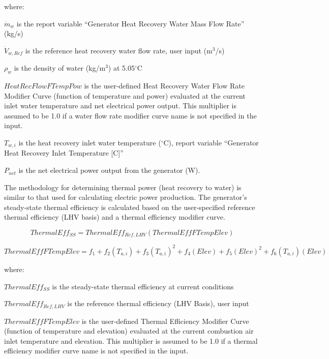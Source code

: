 where:

\({\dot m_w}\) is the report variable ``Generator Heat Recovery Water Mass Flow Rate'' (kg/s)

\({\dot V_{w,Ref}}\) is the reference heat recovery water flow rate, user input (m\(^{3}\)/s)

\({\rho_w}\) is the density of water (kg/m\(^{3}\)) at 5.05\(^{\circ}\)C

\(HeatRecFlowFTempPow\) is the user-defined Heat Recovery Water Flow Rate Modifier Curve (function of temperature and power) evaluated at the current inlet water temperature and net electrical power output. This multiplier is assumed to be 1.0 if a water flow rate modifier curve name is not specified in the input.

\({T_{w,i}}\) is the heat recovery inlet water temperature (\(^{\circ}\)C), report variable ``Generator Heat Recovery Inlet Temperature {[}C{]}''

\({P_{net}}\) is the net electrical power output from the generator (W).

The methodology for determining thermal power (heat recovery to water) is similar to that used for calculating electric power production. The generator's steady-state thermal efficiency is calculated based on the user-specified reference thermal efficiency (LHV basis) and a thermal efficiency modifier curve.

\begin{equation}
ThermalEf{f_{SS}} = ThermalEf{f_{Ref,LHV}}\left( {ThermalEffFTempElev} \right)
\end{equation}

\begin{equation}
ThermalEffFTempElev = {f_1} + {f_2}\left( {{T_{a,i}}} \right) + {f_3}{\left( {{T_{a,i}}} \right)^2} + {f_4}\left( {Elev} \right) + {f_5}{\left( {Elev} \right)^2} + {f_6}\left( {{T_{a,i}}} \right)\left( {Elev} \right)
\end{equation}

where:

\(ThermalEf{f_{SS}}\) is the steady-state thermal efficiency at current conditions

\(ThermalEf{f_{Ref,LHV}}\) is the reference thermal efficiency (LHV Basis), user input

\(ThermalEffFTempElev\) is the user-defined Thermal Efficiency Modifier Curve (function of temperature and elevation) evaluated at the current combustion air inlet temperature and elevation. This multiplier is assumed to be 1.0 if a thermal efficiency modifier curve name is not specified in the input.

